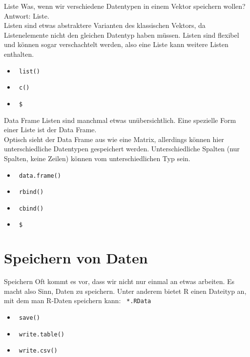 \documentclass[xcolor=dvipsnames, aspectratio = 169]{beamer}
\begin{document}
\begin{frame}[fragile]{Liste}
	Was, wenn wir verschiedene Datentypen in einem Vektor speichern wollen? \\
	Antwort: Liste.\\
	Listen sind etwas abstraktere Varianten des klassischen Vektors, da Listenelemente nicht den gleichen Datentyp haben müssen. Listen sind flexibel und können sogar verschachtelt werden, also eine Liste kann weitere Listen enthalten.
	\begin{itemize}
		\item \verb+ list()+
		\item \verb+ c()+
		\item \verb+ $ +
	\end{itemize}
\end{frame}

\begin{frame}[fragile]{Data Frame}
	Listen sind manchmal etwas unübersichtlich. Eine spezielle Form einer Liste ist der Data Frame.\\
	Optisch sieht der Data Frame aus wie eine Matrix, allerdings können hier unterschiedliche Datentypen gespeichert werden. Unterschiedliche Spalten (nur Spalten, keine Zeilen) können vom unterschiedlichen Typ sein.
	\begin{itemize}
		\item \verb+ data.frame()+
		\item \verb+ rbind()+
		\item \verb+ cbind()+
		\item \verb+ $+
	\end{itemize}
\end{frame}

\section{Speichern von Daten}

\begin{frame}[fragile]{Speichern}
	Oft kommt es vor, dass wir nicht nur einmal an etwas arbeiten. Es macht also Sinn, Daten zu speichern. Unter anderem bietet R einen Dateityp an, mit dem man R-Daten speichern kann: \verb+ *.RData+
	\begin{itemize}
		\item \verb+ save()+
		\item \verb+ write.table()+
		\item \verb+ write.csv()+
	\end{itemize}
\end{frame}
\end{document}
